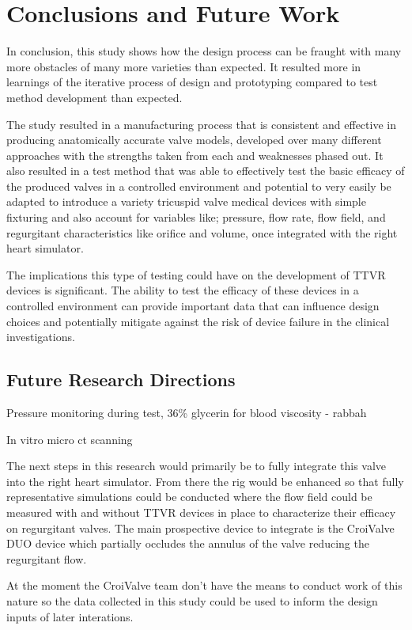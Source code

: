 \chapter{Conclusions and Future Work}\label{ch:conclusion}

In conclusion, this study shows how the design process can be fraught with many more obstacles of many more varieties than expected. It resulted more in learnings of the iterative process of design and prototyping compared to test method development than expected.

The study resulted in a manufacturing process that is consistent and effective in producing anatomically accurate valve models, developed over many different approaches with the strengths taken from each and weaknesses phased out. It also resulted in a test method that was able to effectively test the basic efficacy of the produced valves in a controlled environment and potential to very easily be adapted to introduce a variety tricuspid valve medical devices with simple fixturing and also account for variables like; pressure, flow rate, flow field, and regurgitant characteristics like orifice and volume, once integrated with the right heart simulator.

The implications this type of testing could have on the development of \gls{TTVR} devices is significant. The ability to test the efficacy of these devices in a controlled environment can provide important data that can influence design choices and potentially mitigate against the risk of device failure in the clinical investigations.

\section{Future Research Directions}

Pressure monitoring during test, 36\% glycerin for blood viscosity - rabbah

In vitro micro ct scanning

The next steps in this research would primarily be to fully integrate this valve into the right heart simulator. From there the rig would be enhanced so that fully representative simulations could be conducted where the flow field could be measured with and without \gls{TTVR} devices in place to characterize their efficacy on regurgitant valves. The main prospective device to integrate is the CroiValve DUO device which partially occludes the annulus of the valve reducing the regurgitant flow.

At the moment the CroiValve team don't have the means to conduct work of this nature so the data collected in this study could be used to inform the design inputs of later interations.